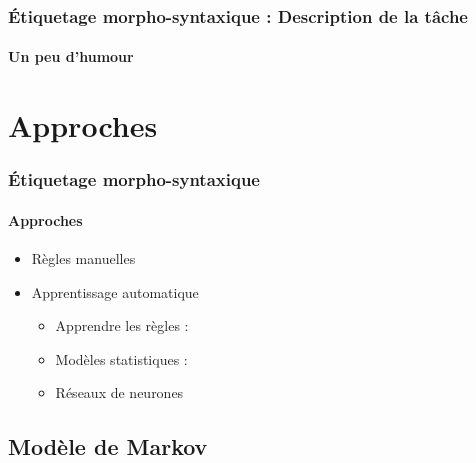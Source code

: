 \documentclass[xcolor=table]{beamer}
\begin{document}
\begin{frame}
\frametitle{Étiquetage morpho-syntaxique : Description de la tâche}
\framesubtitle{Un peu d'humour}

\begin{center}
\end{center}

\end{frame}

\section{Approches}

\begin{frame}
\frametitle{Étiquetage morpho-syntaxique}
\framesubtitle{Approches}

\begin{itemize}
	\item Règles manuelles 
	\item Apprentissage automatique 
	\begin{itemize}
		\item Apprendre les règles : 
		\item Modèles statistiques : 
		\item Réseaux de neurones
	\end{itemize}
\end{itemize}

\end{frame}

\subsection{Modèle de Markov}
\end{document}
